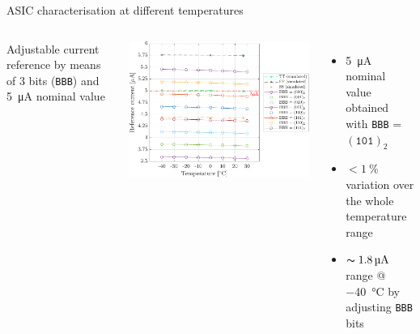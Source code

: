 \documentclass[aspectratio=169,xcolor=dvipsnames,handout]{beamer} %
\newcommand{\greencheck}{{\color{ForestGreen}\checkmark}}
\begin{document}
\begin{frame}{ASIC characterisation at different temperatures}
\begin{columns}[T]
        Adjustable current reference by means of 3 bits (\texttt{BBB}) and \SI{5}{\micro\ampere} nominal value

        \vskip-0.4cm
        \begin{center}
            \includegraphics[height=0.48\textheight]{images/temperature_effects/BGR_current_Xtemp_all-BBB.pdf}
        \end{center}

        \vskip-0.2cm
        \begin{itemize}
            \item \SI{5}{\micro\ampere} nominal value obtained with \texttt{BBB} = $(\texttt{101})_{2}$ \greencheck
            \item $< \SI{1}{\percent}$ variation over the whole temperature range \greencheck
            \item $\thicksim \SI{1.8}{\micro\ampere}$ range @ \SI{-40}{\celsius} by adjusting \texttt{BBB} bits \greencheck
        \end{itemize}
    \end{columns}
\end{frame}


\end{document}
